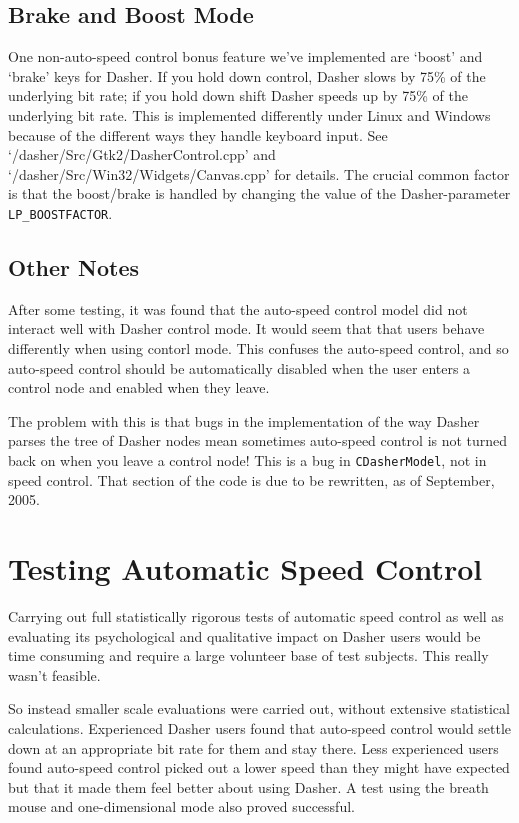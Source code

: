 \documentclass[a4paper,11pt,notitlepage]{article}
\begin{document}
\subsection{Brake and Boost Mode}

One non-auto-speed control bonus feature we've implemented are `boost' and
`brake' keys for Dasher. If you hold down control, Dasher slows by
75\% of the underlying bit rate; if you hold down shift Dasher speeds
up by 75\% of the underlying bit rate. This is implemented differently
under Linux and Windows because of the different ways they handle
keyboard input. See `/dasher/Src/Gtk2/DasherControl.cpp' and
`/dasher/Src/Win32/Widgets/Canvas.cpp' for details. The crucial common
factor is that the boost/brake is handled by changing the value of the
Dasher-parameter \texttt{LP\_BOOSTFACTOR}.

\subsection{Other Notes}

After some testing, it was found that the auto-speed control model did
not interact well with Dasher control mode. It would seem that that
users behave differently when using contorl mode. This confuses the
auto-speed control, and so auto-speed control should be automatically
disabled when the user enters a control node and enabled when they
leave.

The problem with this is that bugs in the implementation of the way
Dasher parses the tree of Dasher nodes mean sometimes auto-speed
control is not turned back on when you leave a control node! This is a
bug in \texttt{CDasherModel}, not in speed control. That section of the
code is due to be rewritten, as of September, 2005.

\section{Testing Automatic Speed Control}

Carrying out full statistically rigorous tests of automatic speed
control as well as evaluating its psychological and qualitative impact
on Dasher users would be time consuming and require a large volunteer
base of test subjects. This really wasn't feasible.

So instead smaller scale evaluations were carried out, without extensive
statistical calculations. Experienced Dasher users found that auto-speed
control would settle down at an appropriate bit rate for them and stay there.
Less experienced users found auto-speed control picked out a lower speed than
they might have expected but that it made them feel better about using Dasher.
A test using the breath mouse and one-dimensional mode also proved successful.
\end{document}
